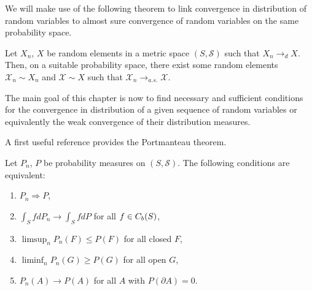 We will make use of the following theorem to link convergence in distribution of random variables to almost sure convergence of random variables on the same probability space.
\begin{theorem}
	Let $X_n$, $X$ be random elements in a metric space $(S, \mathcal{S})$ such that $X_n \rightarrow_d X$. 
	Then, on a suitable probability space, there exist some random elements $\mathcal{X}_n \sim X_n$ and $\mathcal{X} \sim X$
	such that $\mathcal{X}_n \rightarrow_{a.s.} \mathcal{X}$.
\end{theorem}

The main goal of this chapter is now to find necessary and sufficient conditions
for the convergence in distribution of a given sequence of random variables 
or equivalently the weak convergence of their distribution measures.

A first useful reference provides the Portmanteau theorem.
\begin{theorem} \label{T: portmanteau weak}
	Let $P_n$, $P$ be probability measures on $(S, \mathcal{S})$.
	The following conditions are equivalent:
	\begin{enumerate}
		\item $P_n \Rightarrow P$,
		\item $\int_S fdP_n \rightarrow \int_S fdP$ for all $f \in C_b(S)$,
		\item $\limsup_n P_n(F) \leq P(F)$ for all closed $F$,
		\item $\liminf_n P_n(G) \geq P(G)$ for all open $G$,
		\item $P_n(A) \rightarrow P(A)$ for all $A$ with $P(\partial A) = 0$.
	\end{enumerate}
\end{theorem}

